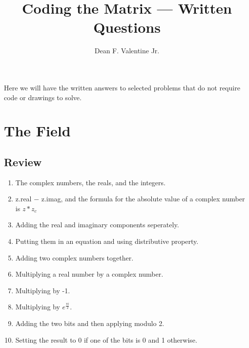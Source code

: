 \documentclass{article}
\title{Coding the Matrix --- Written Questions}
\author{Dean F. Valentine Jr.}
\begin{document}
    \maketitle
    Here we will have the written answers to selected problems that do not
    require code or drawings to solve.
    \section{The Field}
    \subsection{}
    \subsection{}
    \subsection{}
    \subsection{}
    \subsection{}
    \subsection{Review}
    \begin{enumerate}
        \item The complex numbers, the reals, and the integers.
        \item z.real $-$ z.imag, and the formula for the absolute value of a complex number is $z * z_{c}$
        \item Adding the real and imaginary components seperately.
        \item Putting them in an equation and using distributive property.
        \item Adding two complex numbers together.
        \item Multiplying a real number by a complex number.
        \item Multiplying by -1.
        \item Multiplying by $e^{\frac{{\pi}i}{2}}$.
        \item Adding the two bits and then applying modulo 2.
        \item Setting the result to 0 if one of the bits is 0 and 1 otherwise.
    \end{enumerate}
\end{document}
